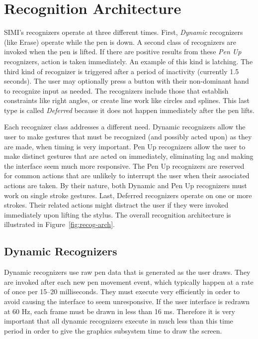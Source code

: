 \section{Recognition Architecture}
\label{sec:recognition-architecture}

SIMI's recognizers operate at three different times. First,
\textit{Dynamic} recognizers (like Erase) operate while the pen is
down. A second class of recognizers are invoked when the pen is
lifted. If there are positive results from these \textit{Pen Up}
recognizers, action is taken immediately. An example of this kind is
latching. The third kind of recognizer is triggered after a period of
inactivity (currently 1.5 seconds). The user may optionally press a
button with their non-dominant hand to recognize input as needed. The
recognizers include those that establish constraints like right
angles, or create line work like circles and splines. This last type
is called \textit{Deferred} because it does not happen immediately
after the pen lifts.



Each recognizer class addresses a different need. Dynamic recognizers
allow the user to make gestures that must be recognized (and possibly
acted upon) as they are made, when timing is very important. Pen Up
recognizers allow the user to make distinct gestures that are acted on
immediately, eliminating lag and making the interface seem much more
responsive. The Pen Up recognizers are reserved for common actions
that are unlikely to interrupt the user when their associated actions
are taken. By their nature, both Dynamic and Pen Up recognizers must
work on single stroke gestures. Last, Deferred recognizers operate on
one or more strokes. Their related actions might distract the user if
they were invoked immediately upon lifting the stylus. The overall
recognition architecture is illustrated in
Figure~\ref{fig:recog-arch}.

\subsection{Dynamic Recognizers}
\label{sec:overview-dynamic-recognizers}

Dynamic recognizers use raw pen data that is generated as the user
draws. They are invoked after each new pen movement event, which
typically happen at a rate of once per 15--20 milliseconds. They must
execute very efficiently in order to avoid causing the interface to
seem unresponsive. If the user interface is redrawn at 60 Hz, each
frame must be drawn in less than 16 ms. Therefore it is very important
that all dynamic recognizers execute in much less than this time
period in order to give the graphics subsystem time to draw the
screen.

